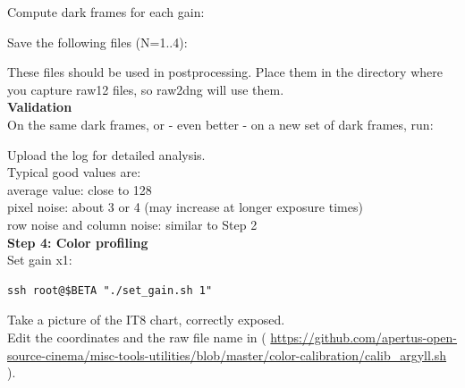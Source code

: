 Compute dark frames for each gain: \\


Save the following files (N=1..4): 
	

These files should be used in postprocessing. Place them in the directory where you capture raw12 files, so raw2dng will use them.\\

\textbf{Validation}\\ 

On the same dark frames, or - even better - on a new set of dark frames, run: 


Upload the log for detailed analysis.\\

Typical good values are:\\

average value: close to 128\\

pixel noise: about 3 or 4 (may increase at longer exposure times)\\

row noise and column noise: similar to Step 2\\

\textbf{Step 4: Color profiling}\\

Set gain x1:\\

\begin{lstlisting}[breaklines=true, breakatwhitespace=true]
ssh root@$BETA "./set_gain.sh 1"
\end{lstlisting} 

Take a picture of the IT8 chart, correctly exposed.\\

Edit the coordinates and the raw file name in  ( \href{https://github.com/apertus-open-source-cinema/misc-tools-utilities/blob/master/color-calibration/calib_argyll.sh}{https://github.com/apertus-open-source-cinema/misc-tools-utilities/blob/master/color-calibration/calib\_argyll.sh} ). \\

